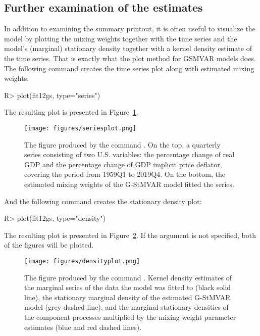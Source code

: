 \documentclass[nojss]{jss}
\begin{document}
\subsection{Further examination of the estimates}\label{sec:examestim}

In addition to examining the summary printout, it is often useful to visualize the model by plotting the mixing weights together with the time series and the model's (marginal) stationary density together with a kernel density estimate of the time series. That is exactly what the plot method for GSMVAR models does. The following command creates the time series plot along with estimated mixing weights:
%
\begin{CodeChunk}
\begin{CodeInput}
R> plot(fit12gs, type="series")
\end{CodeInput}
\end{CodeChunk}
%
The resulting plot is presented in Figure~\ref{fig:seriesplot}.

\begin{figure}[p]
  \centering
  \texttt{[image: figures/seriesplot.png]}
  \caption{The figure produced by the command . On the top, a quarterly series consisting of two U.S. variables: the percentage change of real GDP and the percentage change of GDP implicit price deflator, covering the period from 1959Q1 to 2019Q4. On the bottom, the estimated mixing weights of the G-StMVAR model  fitted the series.}
\label{fig:seriesplot}
\end{figure}

And the following command creates the stationary density plot:
%
\begin{CodeChunk}
\begin{CodeInput}
R> plot(fit12gs, type="density")
\end{CodeInput}
\end{CodeChunk}
%
The resulting plot is presented in Figure~\ref{fig:densityplot}. If the argument  is not specified, both of the figures will be plotted.

\begin{figure}[p]
  \centering
  \texttt{[image: figures/densityplot.png]}
  \caption{The figure produced by the command . Kernel density estimates of the marginal series of the data the model was fitted to (black solid line), the stationary marginal density of the estimated G-StMVAR model (grey dashed line), and the marginal stationary densities of the component processes multiplied by the mixing weight parameter estimates (blue and red dashed lines).}
\label{fig:densityplot}
\end{figure}
\end{document}
